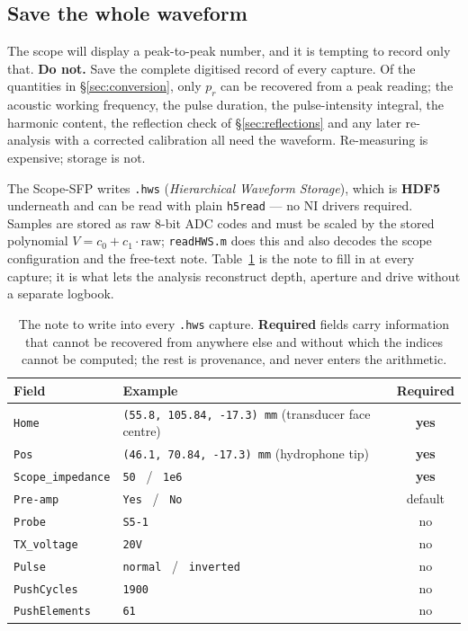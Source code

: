 \documentclass[11pt,a4paper]{article}
\newcommand{\good}[1]{\textcolor{green!45!black}{\textbf{#1}}}
\begin{document}
\subsection{Save the whole waveform}\label{sec:savewaveform}
The scope will display a peak-to-peak number, and it is tempting to record only that. \good{Do not.}
Save the complete digitised record of every capture. Of the quantities in \S\ref{sec:conversion},
only $p_r$ can be recovered from a peak reading; the acoustic working frequency, the pulse duration,
the pulse-intensity integral, the harmonic content, the reflection check of
\S\ref{sec:reflections} and any later re-analysis with a corrected calibration all need the waveform.
Re-measuring is expensive; storage is not.

The Scope-SFP writes \texttt{.hws} (\emph{Hierarchical Waveform Storage}), which is \textbf{HDF5}
underneath and can be read with plain \texttt{h5read} --- no NI drivers required. Samples are stored
as raw 8-bit ADC codes and must be scaled by the stored polynomial $V = c_0 + c_1\cdot\mathrm{raw}$;
\texttt{readHWS.m} does this and also decodes the scope configuration and the free-text note.
Table~\ref{tab:note} is the note to fill in at every capture; it is what lets the analysis
reconstruct depth, aperture and drive without a separate logbook.

\begin{table}[t]
\centering
\small
\caption{The note to write into every \texttt{.hws} capture. \textbf{Required} fields carry
information that cannot be recovered from anywhere else and without which the indices cannot be
computed; the rest is provenance, and never enters the arithmetic.}
\label{tab:note}
\begin{tabular}{llc}
\toprule
Field & Example & Required \\
\midrule
\texttt{Home}             & \texttt{(55.8, 105.84, -17.3) mm} \quad (transducer face centre) & \textbf{yes} \\
\texttt{Pos}              & \texttt{(46.1, 70.84, -17.3) mm} \quad (hydrophone tip)          & \textbf{yes} \\
\texttt{Scope\_impedance} & \texttt{50} \ / \ \texttt{1e6}                                    & \textbf{yes} \\
\midrule
\texttt{Pre-amp}          & \texttt{Yes} \ / \ \texttt{No}                                    & default \\
\texttt{Probe}            & \texttt{S5-1}                                                     & no \\
\texttt{TX\_voltage}      & \texttt{20V}                                                      & no \\
\texttt{Pulse}            & \texttt{normal} \ / \ \texttt{inverted}                           & no \\
\texttt{PushCycles}       & \texttt{1900}                                                     & no \\
\texttt{PushElements}     & \texttt{61}                                                       & no \\
\bottomrule
\end{tabular}
\end{table}
\end{document}
